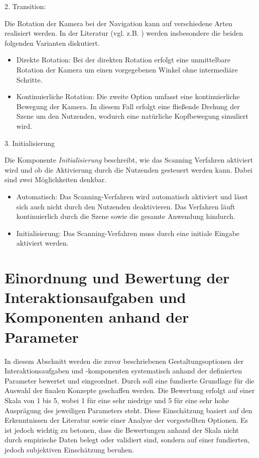 2. Transition: 

Die Rotation der Kamera bei der Navigation kann auf verschiedene Arten realisiert werden. In der Literatur (vgl. z.B. \citet{10.1145/3441852.3471230, 10.1007/s10055-020-00425-x, 8797722}) werden insbesondere die beiden folgenden Varianten diskutiert.

\begin{itemize}
    \item Direkte Rotation: Bei der direkten Rotation erfolgt eine unmittelbare Rotation der Kamera um einen vorgegebenen Winkel ohne intermediäre Schritte. 
    \item Kontinuierliche Rotation: Die zweite Option umfasst eine kontinuierliche Bewegung der Kamera. In diesem Fall erfolgt eine fließende Drehung der Szene um den Nutzenden, wodurch eine natürliche Kopfbewegung simuliert wird. 
\end{itemize}

3. Initialisierung 

Die Komponente \textit{Initialisierung} beschreibt, wie das Scanning Verfahren aktiviert wird und ob die Aktivierung durch die Nutzenden gesteuert werden kann. Dabei sind zwei Möglichkeiten denkbar. 

\begin{itemize}
    \item Automatisch: Das Scanning-Verfahren wird automatisch aktiviert und lässt sich auch nicht durch den Nutzenden deaktivieren. Das Verfahren läuft kontinuierlich durch die Szene sowie die gesamte Anwendung hindurch.
    \item Initialisierung: Das Scanning-Verfahren muss durch eine initiale Eingabe aktiviert werden. 
\end{itemize}

\section{Einordnung und Bewertung der Interaktionsaufgaben und Komponenten anhand der Parameter}

In diesem Abschnitt werden die zuvor beschriebenen Gestaltungsoptionen der Interaktionsaufgaben und -komponenten systematisch anhand der definierten Parameter bewertet und eingeordnet. Durch soll eine fundierte Grundlage für die Auswahl der finalen Konzepte geschaffen werden.
Die Bewertung erfolgt auf einer Skala von 1 bis 5, wobei 1 für eine sehr niedrige und 5 für eine sehr hohe Ausprägung des jeweiligen Parameters steht. Diese Einschätzung basiert auf den Erkenntnissen der Literatur sowie einer Analyse der vorgestellten Optionen. Es ist jedoch wichtig zu betonen, dass die Bewertungen anhand der Skala nicht durch empirische Daten belegt oder validiert sind, sondern auf einer fundierten, jedoch subjektiven Einschätzung beruhen. 

